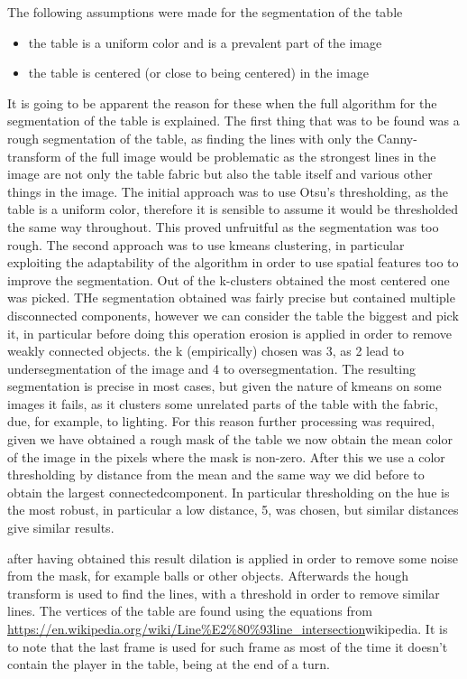 The following assumptions were made for the segmentation of the table
\begin{itemize}
    \item the table is a uniform color and is a prevalent part of the image
    \item the table is centered (or close to being centered) in the image
\end{itemize}

It is going to be apparent the reason for these when the full algorithm for
the segmentation of the table is explained.
The first thing that was to be found was a rough segmentation of the table,
as finding the lines with only the Canny-transform of the full image would 
be problematic as the strongest lines in the image are not only the table
fabric but also the table itself and various other things in the image.
The initial approach was to use Otsu's thresholding, as the table is a uniform
color, therefore it is sensible to assume it would be thresholded the same
way throughout. This proved unfruitful as the segmentation was too rough.
The second approach was to use kmeans clustering, in particular exploiting the
adaptability of the algorithm in order to use spatial features too to improve
the segmentation. Out of the k-clusters obtained the most centered one was picked.
THe segmentation obtained was fairly precise but contained multiple disconnected
components, however we can consider the table the biggest and pick it, in particular
before doing this operation erosion is applied in order to remove weakly connected objects.
the k (empirically) chosen was 3, as 2 lead to undersegmentation of the image and 4 to oversegmentation.
The resulting segmentation is precise in most cases, but given the nature of kmeans on some
images it fails, as it clusters some unrelated parts of the table with the fabric, due,
for example, to lighting.
For this reason further processing was required, given we have obtained a rough mask of
the table we now obtain the mean color of the image in the pixels where the mask is non-zero.
After this we use a color thresholding by distance from the mean and the same way we 
did before to obtain the largest connectedcomponent. In particular thresholding on the hue
is the most robust, in particular a low distance, 5, was chosen, but similar distances give similar
results.\par
after having obtained this result dilation is applied in order to remove some noise from the mask,
for example balls or other objects. Afterwards the hough transform is used to find the lines, 
with a threshold in order to remove similar lines.
The vertices of the table are found using the equations from \url{https://en.wikipedia.org/wiki/Line\%E2\%80\%93line_intersection}{wikipedia}.
It is to note that the last frame is used for such frame as most of the time it doesn't contain the player in the table, being at the end of
a turn.
